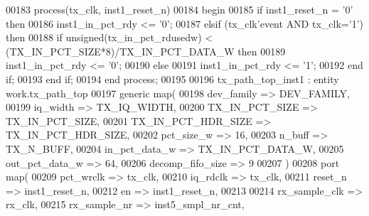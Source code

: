 \begin{DoxyCode}
00183    \textcolor{keywordflow}{process}(tx_clk, inst1_reset_n)
00184 \textcolor{vhdlkeyword}{      begin}
00185       \textcolor{keywordflow}{if} \textcolor{vhdlchar}{inst1_reset_n} \textcolor{vhdlchar}{=} \textcolor{vhdlchar}{'}\textcolor{vhdllogic}{}\textcolor{vhdllogic}{0}\textcolor{vhdlchar}{'} \textcolor{keywordflow}{then} 
00186          inst1\_in\_pct\_rdy <= '0';
00187       \textcolor{keywordflow}{elsif} \textcolor{vhdlchar}{(}\textcolor{vhdlchar}{tx_clk}\textcolor{vhdlchar}{'}\textcolor{vhdlkeyword}{event} \textcolor{keywordflow}{AND} \textcolor{vhdlchar}{tx_clk}\textcolor{vhdlchar}{=}\textcolor{vhdlchar}{'}\textcolor{vhdllogic}{}\textcolor{vhdllogic}{1}\textcolor{vhdlchar}{'}\textcolor{vhdlchar}{)} \textcolor{keywordflow}{then} 
00188          \textcolor{keywordflow}{if} \textcolor{comment}{unsigned}\textcolor{vhdlchar}{(}\textcolor{vhdlchar}{tx_in_pct_rdusedw}\textcolor{vhdlchar}{)} \textcolor{vhdlchar}{<} \textcolor{vhdlchar}{(}\textcolor{vhdlchar}{TX_IN_PCT_SIZE}\textcolor{vhdlchar}{*}\textcolor{vhdllogic}{}\textcolor{vhdllogic}{8}\textcolor{vhdlchar}{)}\textcolor{vhdlchar}{/}\textcolor{vhdlchar}{TX_IN_PCT_DATA_W} \textcolor{keywordflow}{then} 
00189             inst1\_in\_pct\_rdy <= '0';
00190          \textcolor{keywordflow}{else} 
00191             inst1\_in\_pct\_rdy <= '1';
00192          \textcolor{keywordflow}{end} \textcolor{keywordflow}{if};
00193       \textcolor{keywordflow}{end} \textcolor{keywordflow}{if};
00194    \textcolor{keywordflow}{end} \textcolor{keywordflow}{process};
00195 
00196    tx\_path\_top\_inst1 : \textcolor{keywordflow}{entity} work.tx_path_top
00197    \textcolor{keywordflow}{generic} \textcolor{keywordflow}{map}( 
00198       dev_family           => DEV_FAMILY,
00199       iq_width             => TX_IQ_WIDTH,
00200       TX\_IN\_PCT\_SIZE       => TX_IN_PCT_SIZE,
00201       TX\_IN\_PCT\_HDR\_SIZE   => TX_IN_PCT_HDR_SIZE,
00202       pct_size_w           => \textcolor{vhdllogic}{16},
00203       n_buff               => TX_N_BUFF,
00204       in_pct_data_w        => TX_IN_PCT_DATA_W,
00205       out_pct_data_w       => \textcolor{vhdllogic}{64},
00206       decomp_fifo_size     => \textcolor{vhdllogic}{9}
00207       \textcolor{vhdlchar}{)}
00208    \textcolor{keywordflow}{port} \textcolor{keywordflow}{map}(
00209       pct_wrclk            => tx_clk,
00210       iq_rdclk             => tx_clk,
00211       reset_n              => inst1_reset_n,
00212       en                   => inst1_reset_n,
00213       
00214       rx_sample_clk        => rx_clk,
00215       rx_sample_nr         => inst5_smpl_nr_cnt,

\end{DoxyCode}
